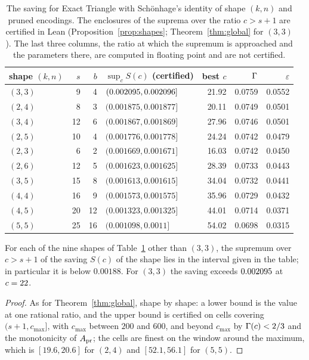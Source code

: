 \begin{table}[ht]
\centering\small
\setlength{\tabcolsep}{4.5pt}
\begin{tabular}{lrrlrrr}
\toprule
shape \((k,n)\) & \(s\) & \(b\) & \(\sup_{c}S(c)\) (certified)
  & best \(c\) & \(\Gamma\) & \(\varepsilon\)\\
\midrule
\((3,3)\) & 9 & 4 & \((0.002095,0.002096]\) & 21.92 & 0.0759 & 0.0552\\
\((2,4)\) & 8 & 3 & \((0.001875,0.001877]\) & 20.11 & 0.0749 & 0.0501\\
\((3,4)\) & 12 & 6 & \((0.001867,0.001869]\) & 27.96 & 0.0746 & 0.0501\\
\((2,5)\) & 10 & 4 & \((0.001776,0.001778]\) & 24.24 & 0.0742 & 0.0479\\
\((2,3)\) & 6 & 2 & \((0.001669,0.001671]\) & 16.03 & 0.0742 & 0.0450\\
\((2,6)\) & 12 & 5 & \((0.001623,0.001625]\) & 28.39 & 0.0733 & 0.0443\\
\((3,5)\) & 15 & 8 & \((0.001613,0.001615]\) & 34.04 & 0.0732 & 0.0441\\
\((4,4)\) & 16 & 9 & \((0.001573,0.001575]\) & 35.96 & 0.0729 & 0.0432\\
\((4,5)\) & 20 & 12 & \((0.001323,0.001325]\) & 44.01 & 0.0714 & 0.0371\\
\((5,5)\) & 25 & 16 & \((0.001098,0.0011]\) & 54.02 & 0.0698 & 0.0315\\
\bottomrule
\end{tabular}
\caption{The saving for Exact Triangle with Sch\"onhage's identity of shape
\((k,n)\) and pruned encodings.  The enclosures of the suprema over the ratio
\(c>s+1\) are certified in Lean (Proposition~\ref{prop:shapes};
Theorem~\ref{thm:global} for \((3,3)\)).  The last three columns, the ratio at
which the supremum is approached and the parameters there, are computed in
floating point and are not certified.}
\label{tab:family}
\end{table}

\begin{proposition}\label{prop:shapes}
For each of the nine shapes of Table~\ref{tab:family} other than \((3,3)\),
the supremum over \(c>s+1\) of the saving \(S(c)\) of the shape lies in the
interval given in the table; in particular it is below \(0.00188\).  For
\((3,3)\) the saving exceeds \(0.002095\) at \(c=22\).
\end{proposition}

\begin{proof}
As for Theorem~\ref{thm:global}, shape by shape: a lower bound is the value at
one rational ratio, and the upper bound is certified on cells covering
\((s+1,c_{\max}]\), with \(c_{\max}\) between \(200\) and \(600\), and beyond
\(c_{\max}\) by \(\Gamma(c)<2/3\) and the monotonicity of \(A_{\mathrm{pr}}\); the cells are
finest on the window around the maximum, which is \([19.6,20.6]\) for
\((2,4)\) and \([52.1,56.1]\) for \((5,5)\).
\end{proof}

